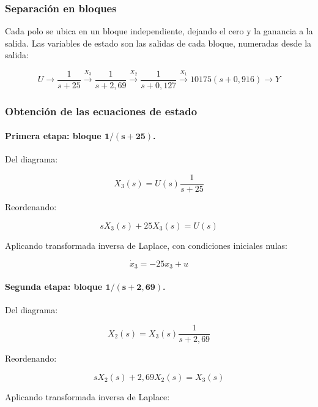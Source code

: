 \documentclass[12pt,a4paper]{article}
\begin{document}
\subsubsection*{Separación en bloques}
Cada polo se ubica en un bloque independiente, dejando el cero y la ganancia a la salida. Las variables de estado son las salidas de cada bloque, numeradas desde la salida:

\begin{equation}U\rightarrow\boxed{\frac{1}{s+25}}\xrightarrow{X_3}\boxed{\frac{1}{s+2{,}69}}\xrightarrow{X_2}\boxed{\frac{1}{s+0{,}127}}\xrightarrow{X_1}\boxed{10175(s+0{,}916)}\rightarrow Y\end{equation}
\subsubsection*{Obtención de las ecuaciones de estado}
\paragraph{Primera etapa: bloque $\boldsymbol{1/(s+25)}$.} Del diagrama:

\begin{equation}X_3(s)=U(s)\frac{1}{s+25}\end{equation}

Reordenando:

\begin{equation}sX_3(s)+25X_3(s)=U(s)\end{equation}

Aplicando transformada inversa de Laplace, con condiciones iniciales nulas:

\begin{equation}\boxed{\dot{x}_3=-25x_3+u}\end{equation}
\paragraph{Segunda etapa: bloque $\boldsymbol{1/(s+2{,}69)}$.} Del diagrama:

\begin{equation}X_2(s)=X_3(s)\frac{1}{s+2{,}69}\end{equation}

Reordenando:

\begin{equation}sX_2(s)+2{,}69X_2(s)=X_3(s)\end{equation}

Aplicando transformada inversa de Laplace:
\end{document}
